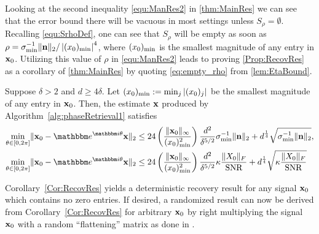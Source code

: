 Looking at the second inequality \eqref{equ:ManRes2} in \cref{thm:MainRes} we can see that the error bound there will be vacuous in most settings unless $S_\rho = \emptyset$.  Recalling \eqref{equ:SrhoDef}, one can see that $S_\rho$ will be empty as soon as $\rho = \sigma_{\min}^{-1} \| \mathbf n \|_2 / \left| (x_0)_{\rm min} \right|^4$, where $(x_0)_{\rm min}$ is the smallest magnitude of any entry in $\mathbf x_0$.  Utilizing this value of $\rho$ in \eqref{equ:ManRes2} leads to proving \cref{Prop:RecovRes} as a corollary of \cref{thm:MainRes} by quoting \eqref{eq:empty_rho} from \cref{lem:EtaBound}.

\begin{corollary} \label{Cor:RecovRes}
Suppose $\delta > 2$ and $d \ge 4 \delta$.  Let $(x_0)_{\rm min} := \min_j |(x_0)_j|$ be the smallest magnitude of any entry in $\mathbf x_0$.  Then, the estimate $\mathbf x$ produced by Algorithm~\ref{alg:phaseRetrieval1} satisfies 
\[\begin{aligned}
\mintheta \norm{\x_0 - \eit \x}_2 &\leq 24 \left( \frac{\norm{\x_0}_{\infty}}{(x_0)^2_{\rm min}} \right) \frac{d^2}{\delta^{5/2}} \sigma_{\min}^{-1} \norm{\n}_2 + d^{\frac{1}{4}} \sqrt{\sigma_{\min}^{-1} \norm{\n}_2 }, \\
\mintheta \norm{\x_0 - \eit \x}_2 &\leq 24 \left( \frac{\norm{\x_0}_{\infty}}{(x_0)^2_{\rm min}} \right) \frac{d^2}{\delta^{5/2}} \kappa \frac{\norm{X_0}_F}{\SNR} + d^{\frac{1}{4}} \sqrt{\kappa \frac{\norm{X_0}_F}{\SNR} }
\end{aligned}
\]
\end{corollary}

Corollary~\ref{Cor:RecovRes} yields a deterministic recovery result for any signal $\mathbf x_0$ which contains no zero entries.  If desired, a randomized result can now be derived from Corollary~\ref{Cor:RecovRes} for arbitrary $\mathbf x_0$ by right multiplying the signal $\mathbf x_0$ %
with a random ``flattening'' matrix as done in \cite{IVW2015_FastPhase}. %
